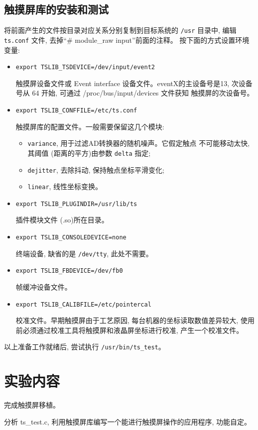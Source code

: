 \subsection{触摸屏库的安装和测试}
将前面产生的文件按目录对应关系分别复制到目标系统的 \verb|/usr| 目录中,
编辑 \verb|ts.conf| 文件, 去掉``\# module\_raw input''前面的注释。
按下面的方式设置环境变量:
\begin{itemize}
    \item \verb|export TSLIB_TSDEVICE=/dev/input/event2|

        触摸屏设备文件或 Event interface 设备文件。eventX的主设备号是13,
        次设备号从 64 开始, 可通过 /proc/bus/input/devices 文件获知
        触摸屏的次设备号。
    \item \verb|export TSLIB_CONFFILE=/etc/ts.conf|

        触摸屏库的配置文件。一般需要保留这几个模块:
    \begin{itemize}
        \item \verb|variance|, 用于过滤AD转换器的随机噪声。它假定触点
            不可能移动太快, 其阈值 (距离的平方)由参数 \verb|delta| 指定;
        \item \verb|dejitter|, 去除抖动, 保持触点坐标平滑变化;
        \item \verb|linear|, 线性坐标变换。
    \end{itemize}
    \item \verb|export TSLIB_PLUGINDIR=/usr/lib/ts|

        插件模块文件 (.so)所在目录。
    \item \verb|export TSLIB_CONSOLEDEVICE=none|

        终端设备, 缺省的是 \verb|/dev/tty|, 此处不需要。
    \item \verb|export TSLIB_FBDEVICE=/dev/fb0|

        帧缓冲设备文件。
    \item \verb|export TSLIB_CALIBFILE=/etc/pointercal|

        校准文件。早期触摸屏由于工艺原因, 每台机器的坐标读取数值差异较大,
        使用前必须通过校准工具将触摸屏和液晶屏坐标进行校准,
        产生一个校准文件。
\end{itemize}

以上准备工作就绪后, 尝试执行 \verb|/usr/bin/ts_test|。

\section{实验内容}
完成触摸屏移植。

分析 ts\_test.c, 利用触摸屏库编写一个能进行触摸屏操作的应用程序, 功能自定。
